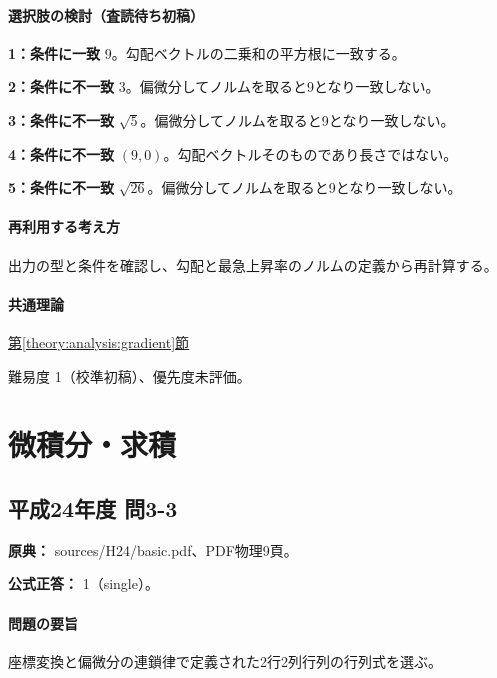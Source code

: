 \paragraph{選択肢の検討（査読待ち初稿）}\mbox{}\par

\noindent\textbf{1：条件に一致} \(9\)。勾配ベクトルの二乗和の平方根に一致する。\par

\noindent\textbf{2：条件に不一致} \(3\)。偏微分してノルムを取ると9となり一致しない。\par

\noindent\textbf{3：条件に不一致} \(\sqrt5\)。偏微分してノルムを取ると9となり一致しない。\par

\noindent\textbf{4：条件に不一致} \((9,0)\)。勾配ベクトルそのものであり長さではない。\par

\noindent\textbf{5：条件に不一致} \(\sqrt{26}\)。偏微分してノルムを取ると9となり一致しない。\par

\paragraph{再利用する考え方} 出力の型と条件を確認し、勾配と最急上昇率のノルムの定義から再計算する。

\paragraph{共通理論} \hyperref[theory:analysis:gradient]{第\ref*{theory:analysis:gradient}節}

\par 難易度 1（校準初稿）、優先度未評価。

\section{微積分・求積}

\subsection{平成24年度 問3-3}
\label{q:h24-reg-basic-3-3}

\noindent\textbf{原典：} sources/H24/basic.pdf、PDF物理9頁。

\textbf{公式正答：} 1（single）。

\paragraph{問題の要旨} 座標変換と偏微分の連鎖律で定義された2行2列行列の行列式を選ぶ。

